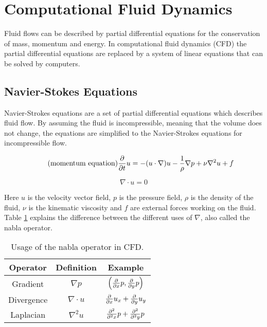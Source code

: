 \section{Computational Fluid Dynamics}

Fluid flows can be described by partial differential equations for the conservation 
of mass, momentum and energy. In computational fluid dynamics (CFD) the partial 
differential equations are replaced by a system of linear equations that can be 
solved by computers. 

\subsection{Navier-Stokes Equations}

Navier-Strokes equations are a set of partial differential equations which describes 
fluid flow\cite{fluidDynamicsIntro}. By assuming the fluid is incompressible, 
meaning that the volume does not change, the equations are simplified to the 
Navier-Strokes equations for incompressible flow\cite{originalSnowThesis}. 

\begin{equation} 
	\tag{momentum equation}
	\frac{\partial}{\partial t}u  = -(u \cdot \nabla)u - \frac{1}{\rho}\nabla p + \nu \nabla^2 u + f
\end{equation}

\begin{equation}
	\tag{continuity equation}
	\nabla \cdot u = 0
\end{equation}

Here $u$ is the velocity vector field, $p$ is the pressure field, $\rho$ is the 
density of the fluid, $\nu$ is the kinematic viscosity and $f$ are external 
forces working on the fluid\cite{gpuGemsCh38}. Table \ref{table:vectorCalculus} 
explains the difference between the different uses of $\nabla$, also called the 
nabla operator\cite{gpuGemsCh38}.

\begin{table}[h]
	\begin{center}
	\bgroup
	\def\arraystretch{1.5}
	\begin{tabular}{ccc}
		\hline
		Operator & Definition & Example \\
		\hline
		Gradient & $ \nabla p $ & $\Big( \frac{\partial}{\partial x}p, \frac{\partial}{\partial y}p \Big)$ \\ \hline
		Divergence & $ \nabla \cdot u $ & $ \frac{\partial}{\partial x}u_x + \frac{\partial}{\partial y}u_y $ \\ \hline
		Laplacian & $ \nabla^2 u $ & $ \frac{\partial^2}{\partial^2 x}p + \frac{\partial^2}{\partial^2 y}p $ \\ \hline
	\end{tabular}
	\egroup
	\end{center}
	\caption{Usage of the nabla operator in CFD.}
	\label{table:vectorCalculus}
\end{table}

